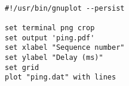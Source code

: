 \section*{}

\begin{verbatim}

#!/usr/bin/gnuplot --persist

set terminal png crop
set output 'ping.pdf'
set xlabel "Sequence number"
set ylabel "Delay (ms)"
set grid
plot "ping.dat" with lines

\end{verbatim}







